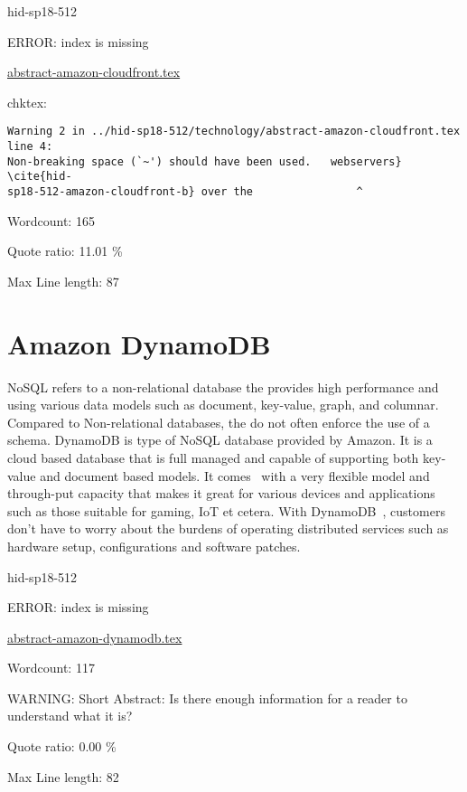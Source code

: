 \begin{IU}

hid-sp18-512

ERROR: index is missing

\href{https://github.com/cloudmesh-community/hid-sp18-512/blob/master//technology/abstract-amazon-cloudfront.tex}{abstract-amazon-cloudfront.tex}

 
chktex:
\begin{tiny}
\begin{verbatim}
Warning 2 in ../hid-sp18-512/technology/abstract-amazon-cloudfront.tex line 4:
Non-breaking space (`~') should have been used.   webservers} \cite{hid-
sp18-512-amazon-cloudfront-b} over the                ^
\end{verbatim}
\end{tiny}

Wordcount: 165


Quote ratio: 11.01 \%
 
Max Line length: 87
\end{IU}

\section{Amazon DynamoDB}

NoSQL refers to a non-relational database the provides high performance and using 
various data models such as document, key-value, graph, and columnar.  Compared 
to Non-relational databases, the do not often enforce the use of a schema. 
DynamoDB is type of NoSQL database provided by Amazon. It is a cloud based 
database that is full managed and capable of supporting both key-value and 
document based models. It comes~\cite{hid-sp18-512-amazon-dynamodb} with a 
very flexible model and through-put capacity that makes it great for various 
devices and applications such as those suitable for gaming, IoT et cetera. 
With DynamoDB~\cite{hid-sp18-512-amazon-dynamodb_faq}, customers don't have 
to worry about the burdens of operating distributed services such as hardware 
setup, configurations and software patches.



\begin{IU}

hid-sp18-512

ERROR: index is missing

\href{https://github.com/cloudmesh-community/hid-sp18-512/blob/master//technology/abstract-amazon-dynamodb.tex}{abstract-amazon-dynamodb.tex}

 

Wordcount: 117

WARNING: Short Abstract: Is there enough information for a reader to understand what it is?


Quote ratio: 0.00 \%
 
Max Line length: 82
\end{IU}

